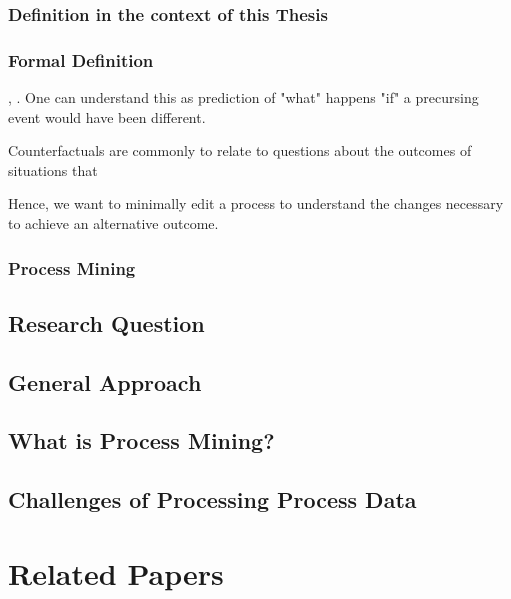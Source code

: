 \documentclass[12pt,a4paper]{report}
\begin{document}
\subsection{Definition in the context of this Thesis}
\subsection{Formal Definition}


, .
One can understand this as prediction of "what" happens "if" a precursing event would have been different.


Counterfactuals are commonly to relate to questions about the outcomes of situations that

Hence, we want to minimally edit a process to understand the changes necessary to achieve an alternative outcome.

\subsection{Process Mining}


\section{Research Question}

\section{General Approach}

\section{What is Process Mining?}

\section{Challenges of Processing Process Data}

\chapter{Related Papers}
\end{document}
